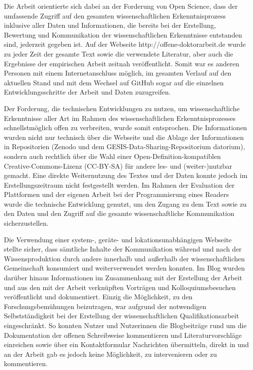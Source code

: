 Die Arbeit orientierte sich dabei an der Forderung von Open Science, dass der umfassende Zugriff auf den gesamten wissenschaftlichen Erkenntnisprozess inklusive aller Daten und Informationen, die bereits bei der Erstellung, Bewertung und Kommunikation der wissenschaftlichen Erkenntnisse entstanden sind, jederzeit gegeben ist. Auf der Webseite http://offene-doktorarbeit.de wurde zu jeder Zeit der gesamte Text sowie die verwendete Literatur, aber auch die Ergebnisse der empirischen Arbeit zeitnah veröffentlicht. Somit war es anderen Personen mit einem Internetanschluss möglich, im gesamten Verlauf auf den aktuellen Stand und mit dem Wechsel auf GitHub sogar auf die einzelnen Entwicklungsschritte der Arbeit und Daten zuzugreifen.

Der Forderung, die technischen Entwicklungen zu nutzen, um wissenschaftliche Erkenntnisse aller Art im Rahmen des wissenschaftlichen Erkenntnisprozesses schnellstmöglich offen zu verbreiten, wurde somit entsprochen. Die Informationen wurden nicht nur technisch über die Webseite und die Ablage der Informationen in Repositorien (Zenodo und dem GESIS-Data-Sharing-Repositorium datorium), sondern auch rechtlich über die Wahl einer Open-Definition-kompatiblen Creative-Commons-Lizenz (CC-BY-SA) für andere les- und (weiter-)nutzbar gemacht. Eine direkte Weiternutzung des Textes und der Daten konnte jedoch im Erstellungszeitraum nicht festgestellt werden. Im Rahmen der Evaluation der Plattformen und der eigenen Arbeit bei der Programmierung eines Readers wurde die technische Entwicklung genutzt, um den Zugang zu dem Text sowie zu den Daten und den Zugriff auf die gesamte wissenschaftliche Kommunikation sicherzustellen.

Die Verwendung einer system-, geräte- und lokationsunabhängigen Webseite stellte sicher, dass sämtliche Inhalte der Kommunikation während und nach der Wissensproduktion durch andere innerhalb und außerhalb der wissenschaftlichen Gemeinschaft konsumiert und weiterverwendet werden konnten. Im Blog wurden darüber hinaus Informationen im Zusammenhang mit der Erstellung der Arbeit und aus den mit der Arbeit verknüpften Vorträgen und Kolloquiumsbesuchen veröffentlicht und dokumentiert. Einzig die Möglichkeit, zu den Forschungsbemühungen beizutragen, war aufgrund der notwendigen Selbstständigkeit bei der Erstellung der wissenschaftlichen Qualifikationsarbeit eingeschränkt. So konnten Nutzer und Nutzerinnen die Blogbeiträge rund um die Dokumentation der offenen Schreibweise kommentieren und Literaturvorschläge einreichen sowie über ein Kontaktformular Nachrichten übermitteln, direkt in und an der Arbeit gab es jedoch keine Möglichkeit, zu intervenieren oder zu kommentieren.


